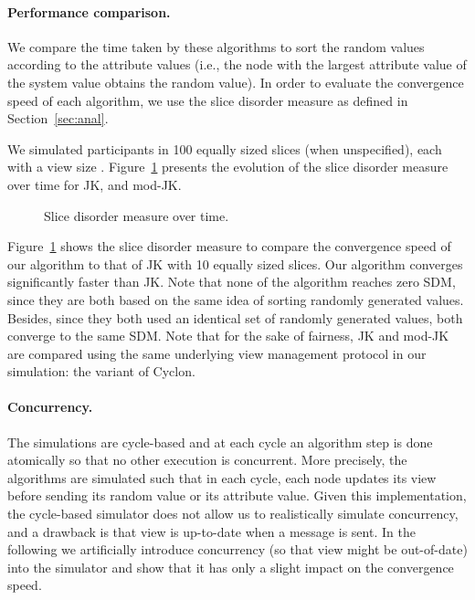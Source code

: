 \documentclass[times,10pt,twocolumn]{article}
\begin{document}
\paragraph{Performance comparison.}

We compare the time taken by these algorithms 
to sort the random values according to the attribute values (i.e., the node with 
the  largest attribute value of the system value obtains the  random value).
In order to evaluate the convergence speed of each algorithm, we use the slice
disorder measure as defined in Section~\ref{sec:anal}.

We simulated  participants in 100 equally sized slices (when unspecified), each with 
a view size .  
Figure~\ref{fig:convergence1} presents the evolution of
the slice disorder measure over time for JK, and mod-JK.



\begin{figure}[t]
  \begin{center}
    \label{fig:convergence1}
    \caption{Slice disorder measure over time.}
  \end{center}
\end{figure}  




Figure~\ref{fig:convergence1} shows the slice disorder measure to compare
the convergence speed of our algorithm to that of JK with 10 equally sized slices.
Our algorithm converges significantly faster than JK.
Note that none of the algorithm reaches zero SDM, since they are both based on
the same idea of sorting randomly generated values.
Besides, since they both used an identical set of randomly generated values,
both converge to the same SDM. Note that for the sake of fairness, JK and mod-JK 
are compared using the same underlying view management protocol in our 
simulation: the variant of Cyclon.

\paragraph{Concurrency.}

The simulations are cycle-based and at each cycle an 
algorithm step is done atomically so that no other execution is concurrent.
More precisely, the algorithms are simulated such that in each cycle, each node updates its view 
before sending its random value or its attribute value.  Given this implementation, the 
cycle-based simulator does not allow us to realistically simulate concurrency, and a
drawback is that view is up-to-date when a message is sent.  In the following 
we artificially introduce concurrency (so that view might be out-of-date) into the 
simulator and show that it has only a slight impact on the convergence speed.
\end{document}
